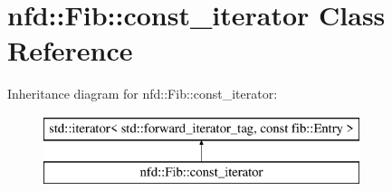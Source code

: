 \hypertarget{classnfd_1_1Fib_1_1const__iterator}{}\section{nfd\+:\+:Fib\+:\+:const\+\_\+iterator Class Reference}
\label{classnfd_1_1Fib_1_1const__iterator}
Inheritance diagram for nfd\+:\+:Fib\+:\+:const\+\_\+iterator\+:\begin{figure}[H]
\begin{center}
\leavevmode
\includegraphics[height=2.000000cm]{classnfd_1_1Fib_1_1const__iterator}
\end{center}
\end{figure}
